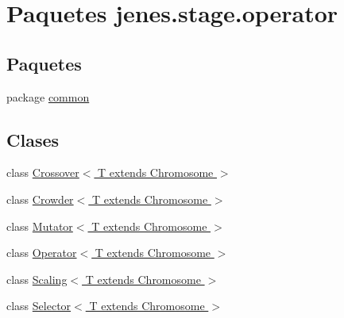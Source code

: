 \hypertarget{namespacejenes_1_1stage_1_1operator}{\section{Paquetes jenes.\-stage.\-operator}
\label{namespacejenes_1_1stage_1_1operator}
}
\subsection*{Paquetes}
\begin{DoxyCompactItemize}
\item 
package \hyperlink{namespacejenes_1_1stage_1_1operator_1_1common}{common}
\end{DoxyCompactItemize}
\subsection*{Clases}
\begin{DoxyCompactItemize}
\item 
class \hyperlink{classjenes_1_1stage_1_1operator_1_1_crossover_3_01_t_01extends_01_chromosome_01_4}{Crossover$<$ T extends Chromosome $>$}
\item 
class \hyperlink{classjenes_1_1stage_1_1operator_1_1_crowder_3_01_t_01extends_01_chromosome_01_4}{Crowder$<$ T extends Chromosome $>$}
\item 
class \hyperlink{classjenes_1_1stage_1_1operator_1_1_mutator_3_01_t_01extends_01_chromosome_01_4}{Mutator$<$ T extends Chromosome $>$}
\item 
class \hyperlink{classjenes_1_1stage_1_1operator_1_1_operator_3_01_t_01extends_01_chromosome_01_4}{Operator$<$ T extends Chromosome $>$}
\item 
class \hyperlink{classjenes_1_1stage_1_1operator_1_1_scaling_3_01_t_01extends_01_chromosome_01_4}{Scaling$<$ T extends Chromosome $>$}
\item 
class \hyperlink{classjenes_1_1stage_1_1operator_1_1_selector_3_01_t_01extends_01_chromosome_01_4}{Selector$<$ T extends Chromosome $>$}
\end{DoxyCompactItemize}
